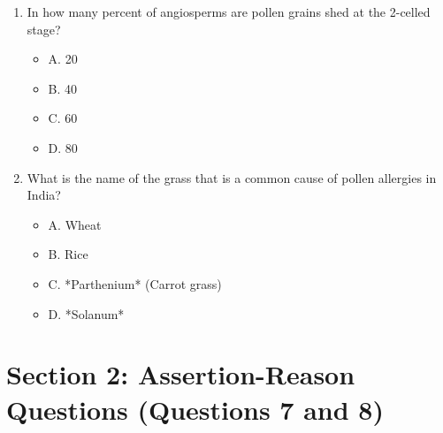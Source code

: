 \documentclass{article}
\begin{document}
\begin{enumerate}
\begin{itemize}
        \end{itemize}
    \item In how many percent of angiosperms are pollen grains shed at the 2-celled stage?
        \begin{itemize}
            \item A. 20%
            \item B. 40%
            \item C. 60%
            \item D. 80%
        \end{itemize}
    \item  What is the name of the grass that is a common cause of pollen allergies in India?
        \begin{itemize}
            \item A. Wheat
            \item B. Rice
            \item C. *Parthenium* (Carrot grass)
            \item D. *Solanum*
        \end{itemize}
\end{enumerate}


\section*{Section 2: Assertion-Reason Questions (Questions 7 and 8)}
\end{document}
